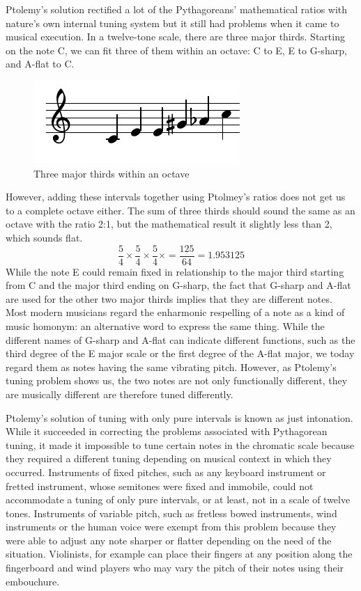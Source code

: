 Ptolemy's solution rectified a lot of the Pythagoreans' mathematical ratios with nature's
own internal tuning system but it still had problems when it came to musical execution.
In a twelve-tone scale, there are three major thirds. Starting on the note C, we can fit
three of them within an octave: C to E, E to G-sharp, and A-flat to C.
\begin{figure}[h]
\centering
\includegraphics{examples/thirds.pdf}
\caption{Three major thirds within an octave}
\end{figure}
However, adding these intervals together using Ptolmey's ratios does not get us to a
complete octave either.  The sum of three thirds should sound the same as an octave with
the ratio 2:1, but the mathematical result it slightly less than 2, which sounds flat.
\begin{equation}
    \frac{5}{4} \times
    \frac{5}{4} \times
    \frac{5}{4} \times = \frac{125}{64} = 1.953125
\end{equation}
While the note E could remain fixed in relationship to the major third starting from C and
the major third ending on G-sharp, the fact that G-sharp and A-flat are used for the other
two major thirds implies that they are different notes. Most modern musicians regard the
enharmonic respelling of a note as a kind of music homonym: an alternative word to express
the same thing.  While the different names of G-sharp and A-flat can indicate different
functions, such as the third degree of the E major scale or the first degree of the A-flat
major, we today regard them as notes having the same vibrating pitch. However, as
Ptolemy's tuning problem shows us, the two notes are not only functionally different, they
are musically different are therefore tuned differently.

Ptolemy's solution of tuning with only pure intervals is known as just intonation.  While
it succeeded in correcting the problems associated with Pythagorean tuning, it made it
impossible to tune certain notes in the chromatic scale because they required a different
tuning depending on musical context in which they occurred.  Instruments of fixed pitches,
such as any keyboard instrument or fretted instrument, whose semitones were fixed and
immobile, could not accommodate a tuning of only pure intervals, or at least, not in a
scale of twelve tones.  Instruments of variable pitch, such as fretless bowed instruments,
wind instruments or the human voice were exempt from this problem because they were able
to adjust any note sharper or flatter depending on the need of the situation.  Violinists,
for example can place their fingers at any position along the fingerboard and wind players
who may vary the pitch of their notes using their embouchure.


